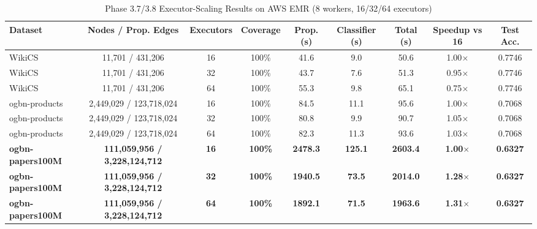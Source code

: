 \begin{table}[!t]
\renewcommand{\arraystretch}{1.2}
\caption{Phase 3.7/3.8 Executor-Scaling Results on AWS EMR (8 workers, 16/32/64 executors)}
\label{table_scalability_main}
\centering
\begin{tabular}{lcccccccc}
\toprule
\textbf{Dataset} & \textbf{Nodes / Prop. Edges} & \textbf{Executors} & \textbf{Coverage} & \textbf{Prop. (s)} & \textbf{Classifier (s)} & \textbf{Total (s)} & \textbf{Speedup vs 16} & \textbf{Test Acc.} \\
\midrule
WikiCS & 11,701 / 431,206 & 16 & 100\% & 41.6 & 9.0 & 50.6 & 1.00$\times$ & 0.7746 \\
WikiCS & 11,701 / 431,206 & 32 & 100\% & 43.7 & 7.6 & 51.3 & 0.95$\times$ & 0.7746 \\
WikiCS & 11,701 / 431,206 & 64 & 100\% & 55.3 & 9.8 & 65.1 & 0.75$\times$ & 0.7746 \\
\midrule
ogbn-products & 2,449,029 / 123,718,024 & 16 & 100\% & 84.5 & 11.1 & 95.6 & 1.00$\times$ & 0.7068 \\
ogbn-products & 2,449,029 / 123,718,024 & 32 & 100\% & 80.8 & 9.9 & 90.7 & 1.05$\times$ & 0.7068 \\
ogbn-products & 2,449,029 / 123,718,024 & 64 & 100\% & 82.3 & 11.3 & 93.6 & 1.03$\times$ & 0.7068 \\
\midrule
\textbf{ogbn-papers100M} & \textbf{111,059,956 / 3,228,124,712} & \textbf{16} & \textbf{100\%} & \textbf{2478.3} & \textbf{125.1} & \textbf{2603.4} & \textbf{1.00$\times$} & \textbf{0.6327} \\
\textbf{ogbn-papers100M} & \textbf{111,059,956 / 3,228,124,712} & \textbf{32} & \textbf{100\%} & \textbf{1940.5} & \textbf{73.5} & \textbf{2014.0} & \textbf{1.28$\times$} & \textbf{0.6327} \\
\textbf{ogbn-papers100M} & \textbf{111,059,956 / 3,228,124,712} & \textbf{64} & \textbf{100\%} & \textbf{1892.1} & \textbf{71.5} & \textbf{1963.6} & \textbf{1.31$\times$} & \textbf{0.6327} \\
\bottomrule
\end{tabular}
\end{table}
